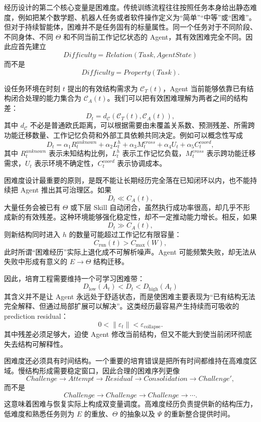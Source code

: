 经历设计的第二个核心变量是困难度。传统训练流程往往按照任务本身给出静态难度，例如把某个数学题、机器人任务或者软件操作定义为“简单”“中等”或“困难”。但对于持续智能体，困难并不是任务固有的标量属性。同一个任务对于不同阶段、不同身体、不同 $\Theta$ 和不同当前工作记忆状态的 Agent，其有效困难完全不同。因此应首先建立
\[
\boxed{
Difficulty
=
Relation(Task,AgentState)
}
\]
而不是
\[
Difficulty=Property(Task).
\]

设任务环境在时刻 $t$ 提出的有效结构需求为 $\mathcal C_T(t)$，Agent 当前能够依靠已有结构闭合处理的能力集合为 $\mathcal C_A(t)$。我们可以把有效困难理解为两者之间的结构差：
\[
D_t
=
d_{\mathcal C}
\left(
\mathcal C_T(t),
\mathcal C_A(t)
\right),
\]
其中 $d_{\mathcal C}$ 不必是普通欧氏距离，可以根据需要由未覆盖关系数、预测残差、所需跨功能迁移数量、工作记忆负荷和外部工具依赖共同决定。例如可以概念性写成
\[
D_t
=
\alpha_1 R_t^{unknown}
+
\alpha_2 L_t^{h}
+
\alpha_3 M_t^{cross}
+
\alpha_4 U_t
+
\alpha_5 C_t^{coord},
\]
其中 $R_t^{unknown}$ 表示未知结构比例，$L_t^{h}$ 表示工作记忆负载，$M_t^{cross}$ 表示跨功能迁移需求，$U_t$ 表示环境不确定性，$C_t^{coord}$ 表示协调成本。

困难度设计最重要的原则，是既不能让长期经历完全落在已知闭环以内，也不能持续把 Agent 推出其可治理区。如果
\[
D_t\ll C_A(t),
\]
大量任务会被已有 $\Theta$ 或下层 Skill 自动闭合，虽然执行成功率很高，却几乎不形成新的有效残差。这种环境能够强化稳定性，却不一定推动能力增长。相反，如果
\[
D_t\gg C_A(t),
\]
则新结构同时进入 $h$ 的数量可能超过工作记忆有限容量：
\[
C_{\mathrm{run}}(t)
>
C_{\max}(W),
\]
此时所谓“困难经历”实际上退化成不可解析噪声。Agent 可能频繁失败，却无法从失败中形成有意义的 $E\rightarrow\Theta$ 结构迁移。

因此，培育工程需要维持一个可学习困难带：
\[
\boxed{
D_{\mathrm{low}}(A_t)
<
D_t
<
D_{\mathrm{high}}(A_t)
}
\]
其含义并不是让 Agent 永远处于舒适状态，而是使困难主要表现为“已有结构无法完全解释、但通过局部扩展可以解决”。这类经历最容易产生持续而可吸收的 prediction residual：
\[
0
<
\|\varepsilon_t\|
<
\varepsilon_{\mathrm{collapse}}.
\]
其中残差必须足够大，迫使 Agent 修改当前结构，但又不能大到使当前闭环彻底失去结构可解释性。

困难度还必须具有时间结构。一个重要的培育错误是把所有时间都维持在高难度区域。慢结构形成需要稳定窗口，因此合理的困难序列更像
\[
Challenge
\rightarrow
Attempt
\rightarrow
Residual
\rightarrow
Consolidation
\rightarrow
Challenge',
\]
而不是
\[
Challenge
\rightarrow
Challenge
\rightarrow
Challenge
\rightarrow\cdots.
\]
这意味着困难与恢复实际上构成双变量调度。高难度经历负责提供新的结构压力，低难度和熟悉任务则为 $E$ 的重放、$\Theta$ 的抽象以及 $\Psi$ 的重新整合提供时间。

